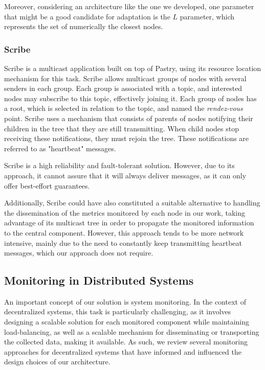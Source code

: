 Moreover, considering an architecture like the one we developed, one parameter that might be a good candidate for adaptation is the $L$ parameter, which represents the set of numerically the closest nodes.

\subsubsection{Scribe}
\label{sssec:scribe}
Scribe\cite{Rowstron2001a, Castro2002} is a multicast application built on top of Pastry, using its resource location mechanism for this task. Scribe allows multicast groups of nodes with several senders in each group. Each group is associated with a topic, and interested nodes may subscribe to this topic, effectively joining it. Each group of nodes has a root, which is selected in relation to the topic, and named the \textit{rendez-vous} point. Scribe uses a mechanism that consists of parents of nodes notifying their children in the tree that they are still transmitting. When child nodes stop receiving these notifications, they must rejoin the tree. These notifications are referred to as "heartbeat" messages.

Scribe is a high reliability and fault-tolerant solution. However, due to its approach, it cannot assure that it will always deliver messages, as it can only offer best-effort guarantees.

Additionally, Scribe could have also constituted a suitable alternative to handling the dissemination of the metrics monitored by each node in our work, taking advantage of its multicast tree in order to propagate the monitored information to the central component. However, this approach tends to be more network intensive, mainly due to the need to constantly keep transmitting heartbeat messages, which our approach does not require.

\subsection{Monitoring in Distributed Systems}
\label{ssec:monitoring_in_distributed_systems}

An important concept of our solution is system monitoring. In the context of decentralized systems, this task is particularly challenging, as it involves designing a scalable solution for each monitored component while maintaining load-balancing, as well as a scalable mechanism for disseminating or transporting the collected data, making it available. As such, we review several monitoring approaches for decentralized systems that have informed and influenced the design choices of our architecture.

